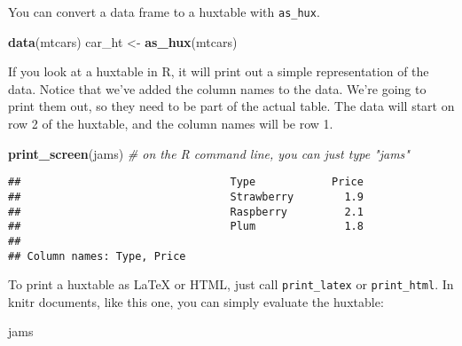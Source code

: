 \documentclass[]{article}
\newenvironment{Shaded}{\begin{snugshade}}{\end{snugshade}}
\newcommand{\CommentTok}[1]{\textcolor[rgb]{0.56,0.35,0.01}{\textit{#1}}}
\newcommand{\KeywordTok}[1]{\textcolor[rgb]{0.13,0.29,0.53}{\textbf{#1}}}
\newcommand{\NormalTok}[1]{#1}
\newcommand{\StringTok}[1]{\textcolor[rgb]{0.31,0.60,0.02}{#1}}
\begin{document}
\FloatBarrier

You can convert a data frame to a huxtable with \texttt{as\_hux}.

\begin{Shaded}
\begin{Highlighting}[]
\KeywordTok{data}\NormalTok{(mtcars)}
\NormalTok{car_ht <-}\StringTok{ }\KeywordTok{as_hux}\NormalTok{(mtcars)}
\end{Highlighting}
\end{Shaded}

\FloatBarrier

If you look at a huxtable in R, it will print out a simple
representation of the data. Notice that we've added the column names to
the data. We're going to print them out, so they need to be part of the
actual table. The data will start on row 2 of the huxtable, and the
column names will be row 1.

\begin{Shaded}
\begin{Highlighting}[]
\KeywordTok{print_screen}\NormalTok{(jams)     }\CommentTok{# on the R command line, you can just type "jams"}
\end{Highlighting}
\end{Shaded}

\begin{verbatim}
##                                 Type            Price  
##                                 Strawberry        1.9  
##                                 Raspberry         2.1  
##                                 Plum              1.8  
## 
## Column names: Type, Price
\end{verbatim}

\FloatBarrier

To print a huxtable as LaTeX or HTML, just call \texttt{print\_latex} or
\texttt{print\_html}. In knitr documents, like this one, you can simply
evaluate the huxtable:

\begin{Shaded}
\begin{Highlighting}[]
\NormalTok{jams}
\end{Highlighting}
\end{Shaded}

 
  \providecommand{\huxb}[2]{\arrayrulecolor[RGB]{#1}\global\arrayrulewidth=#2pt}
  \providecommand{\huxvb}[2]{\color[RGB]{#1}\vrule width #2pt}
  \providecommand{\huxtpad}[1]{\rule{0pt}{#1}}
  \providecommand{\huxbpad}[1]{\rule[-#1]{0pt}{#1}}
\end{document}
